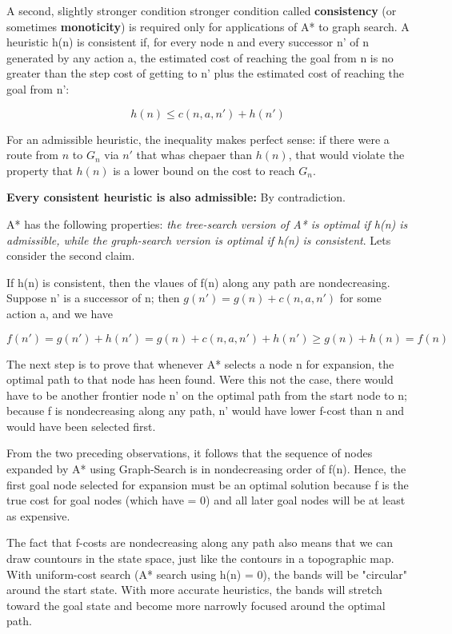 \documentclass{article}
\begin{document}
A second, slightly stronger condition stronger condition called \textbf{consistency} (or sometimes \textbf{monoticity}) is required only for applications of A* to graph search. A heuristic h(n) is consistent if, for every node n and every successor n' of n generated by any action a, the estimated cost of reaching the goal from n is no greater than the step cost of getting to n' plus the estimated cost of reaching the goal from n':

$$ h(n) \leq c(n, a, n') + h(n') $$

For an admissible heuristic, the inequality makes perfect sense: if there were a route from $ n $ to $ G_{n} $ via $ n' $ that whas chepaer than $ h(n) $, that would violate the property that $ h(n) $ is a lower bound on the cost to reach $ G_n $.

\textbf{Every consistent heuristic is also admissible:} By contradiction.

A* has the following properties: \textit{the tree-search version of A* is optimal if h(n) is admissible, while the graph-search version is optimal if h(n) is consistent}. Lets consider the second claim.

If h(n) is consistent, then the vlaues of f(n) along any path are nondecreasing. Suppose n' is a successor of n; then $ g(n') = g(n) + c(n, a, n') $ for some action a, and we have

$$ f(n') = g(n') + h(n') = g(n) + c(n, a, n') + h(n') \geq g(n) + h(n) = f(n) $$

The next step is to prove that whenever A* selects a node n for expansion, the optimal path to that node has heen found. Were this not the case, there would have to be another frontier node n' on the optimal path from the start node to n; because f is nondecreasing along any path, n' would have lower f-cost than n and would have been selected first.

From the two preceding observations, it follows that the sequence of nodes expanded by A* using Graph-Search is in nondecreasing order of f(n). Hence, the first goal node selected for expansion must be an optimal solution because f is the true cost for goal nodes (which have = 0) and all later goal nodes will be at least as expensive.

The fact that f-costs are nondecreasing along any path also means that we can draw countours in the state space, just like the contours in a topographic map. With uniform-cost search (A* search using h(n) = 0), the bands will be "circular" around the start state. With more accurate heuristics, the bands will stretch toward the goal state and become more narrowly focused around the optimal path. 
\end{document}
